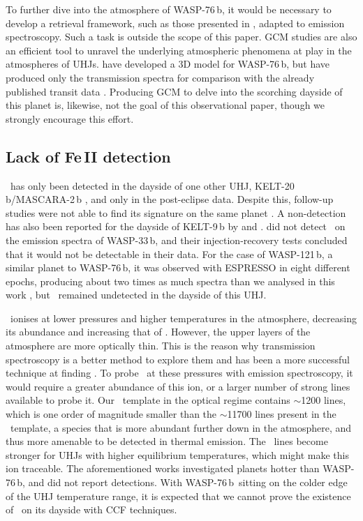\documentclass{aa}
\newcommand{\feI}{\ion{Fe}{i}}
\newcommand{\feII}{\ion{Fe}{ii}}
\newcommand{\planet}{WASP-76\,b}
\begin{document}
To further dive into the atmosphere of \planet, it would be necessary to develop a retrieval framework, such as those presented in \citet{brogi2019, seidel2020, seidel2021, pelletier2021, gandhi2022}, adapted to emission spectroscopy. Such a task is outside the scope of this paper. GCM studies are also an efficient tool to unravel the underlying atmospheric phenomena at play in the atmospheres of UHJs. \citet{wardenier2021, wardenier2023} have developed a 3D model for \planet, but have produced only the transmission spectra for comparison with the already published transit data \citep{ehrenreich2020}. Producing GCM to delve into the scorching dayside of this planet is, likewise, not the goal of this observational paper, though we strongly encourage this effort. 


\subsection{Lack of Fe\,II detection}
\label{sect:feII_discussion}


\feII\ has only been detected in the dayside of one other UHJ, KELT-20\,b/MASCARA-2\,b \citep{borsa2022}, and only in the post-eclipse data. Despite this, follow-up studies were not able to find its signature on the same planet \citep{yan2022, kasper2023, petz2024}. A non-detection has also been reported for the dayside of KELT-9\,b by \citet{pino2020} and \citet{riddenharper2023}. \citet{cont2022} did not detect \feII\ on the emission spectra of WASP-33\,b, and their injection-recovery tests concluded that it would not be detectable in their data. For the case of WASP-121\,b, a similar planet to \planet, it was observed with ESPRESSO in eight different epochs, producing about two times as much spectra than we analysed in this work \citep{hoeijmakers2024}, but \feII\ remained undetected in the dayside of this UHJ.

\feI\ ionises at lower pressures and higher temperatures in the atmosphere, decreasing its abundance and increasing that of \feII. However, the upper layers of the atmosphere are more optically thin. This is the reason why transmission spectroscopy is a better method to explore them and has been a more successful technique at finding \feII. To probe \feII\ at these pressures with emission spectroscopy, it would require a greater abundance of this ion, or a larger number of strong lines available to probe it. Our \feII\ template in the optical regime contains $\sim$1200 lines, which is one order of magnitude smaller than the $\sim$11700 lines present in the \feI\ template, a species that is more abundant further down in the atmosphere, and thus more amenable to be detected in thermal emission. The \feII\ lines become stronger for UHJs with higher equilibrium temperatures, which might make this ion traceable. The aforementioned works investigated planets hotter than \planet, and did not report detections. With \planet\ sitting on the colder edge of the UHJ temperature range, it is expected that we cannot prove the existence of \feII\ on its dayside with CCF techniques.
\end{document}
